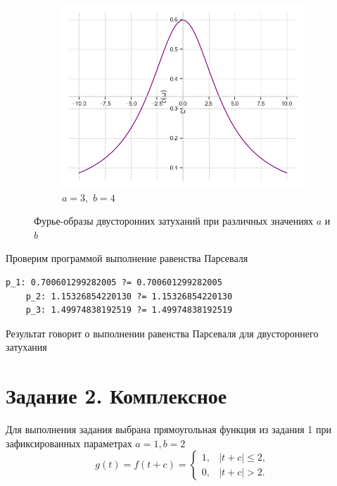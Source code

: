 \documentclass[a4paper, 16pt]{article}
\begin{document}
\begin{figure}[htbp]
\begin{subfigure}{0.3\textwidth}
            \centering
            \includegraphics[width=\linewidth]{doatfimg_a=3_b=4.png}
            \caption{$a=3,\,\,b=4$}
            \label{fig:doatfimg_3}
        \end{subfigure}
        \caption{Фурье-образы двусторонних затуханий при различных значениях $a$ и $b$}
        \label{fig:doatfimgs}
    \end{figure}




    \noindent Проверим программой выполнение равенства Парсеваля
    \begin{lstlisting}[label=pars_doat, caption=Равенство Парсеваля для функции Гаусса]
    p_1: 0.700601299282005 ?= 0.700601299282005
    p_2: 1.15326854220130 ?= 1.15326854220130
    p_3: 1.49974838192519 ?= 1.49974838192519
    \end{lstlisting}


    \noindent Результат говорит о выполнении равенства Парсеваля для двустороннего затухания


    \section{Задание 2. Комплексное}
    \noindent Для выполнения задания выбрана прямоугольная функция из задания 1 при зафиксированных
    параметрах $a=1,b=2$
    $$
    g(t)=f(t+c)=
    \begin{cases}
        1, & \left|t+c\right|\leq 2,\\
        0, & \left|t+c\right|>2.
    \end{cases}
    $$
\end{document}
